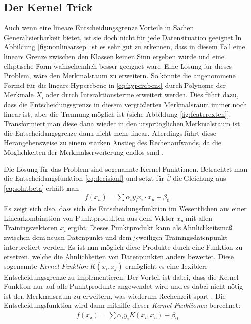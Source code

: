 \documentclass[
]{article}
\begin{document}
\subsection{Der Kernel Trick}

Auch wenn eine lineare Entscheidungsgrenze Vorteile in Sachen
Generalisierbarkeit bietet, ist sie doch nicht für jede Datensituation
geeignet.In Abbildung \ref{fig:nonlinearsep} ist es sehr gut zu
erkennen, dass in diesem Fall eine lineare Grenze zwischen den Klassen
keinen Sinn ergeben würde und eine elliptische Form wahrscheinlich
besser geeignet wäre. Eine Lösung für dieses Problem, wäre den
Merkmalsraum zu erweitern. So könnte die angenommene Formel für die
lineare Hyperebene in \eqref{eq:hyperebene} durch Polynome der Merkmale
\(X_i\) oder durch Interaktionsterme erweitert werden. Dies führt dazu,
dass die Entscheidungsgrenze in diesem vergrößerten Merkmalsraum immer
noch linear ist, aber die Trennung möglich ist (siehe Abbildung
\ref{fig:featurexten}). Transformiert man diese dann wieder in den
ursprünglichen Merkmalsraum ist die Entscheidungsgrenze dann nicht mehr
linear. Allerdings führt diese Herangehensweise zu einem starken Anstieg
des Rechenaufwands, da die Möglichkeiten der Merkmalserweiterung endlos
sind \parencite{jamesIntroductionStatisticalLearning2021}.

Die Lösung für das Problem sind sogenannte Kernel Funktionen. Betrachtet
man die Entscheidungsfunktion \eqref{eq:decisionf} und setzt für
\(\overline{\beta}\) die Gleichung aus \eqref{eq:solutbeta} erhält man
\begin{align}
f(x_u)= \sum \alpha_i y_i x_i \cdot x_u +\beta_0
\end{align} Es zeigt sich also, dass sich die Entscheidungsfunktion im
Wesentlichen aus einer Linearkombination von Punktprodukten aus dem
Vektor \(x_u\) mit allen Trainingsvektoren \(x_i\) ergibt. Dieses
Punktprodukt kann als Ähnlichkeitsmaß zwischen dem neuen Datenpunkt und
dem jeweiligen Trainingsdatenpunkt interpretiert werden. Es ist nun
möglich diese Produkte durch eine Funktion zu ersetzen, welche die
Ähnlichkeiten von Datenpunkten anders bewertet. Diese sogenannte
\textit{Kernel Funktion} \(K(x_i,x_j)\) ermöglicht es eine flexiblere
Entscheidungsgrenze zu implementieren. Der Vorteil ist dabei, dass die
Kernel Funktion nur auf alle Punktprodukte angewendet wird und es dabei
nicht nötig ist den Merkmalsraum zu erweitern, was wiederum Rechenzeit
spart \parencite{jamesIntroductionStatisticalLearning2021}. Die
Entscheidungsfunktion wird dann mithilfe dieser
\textit{Kernel Funktionen} berechnet: \begin{align}
  f(x_u)=\sum \alpha_i y_i K(x_i,x_u)+\beta_0
\end{align}
\end{document}
